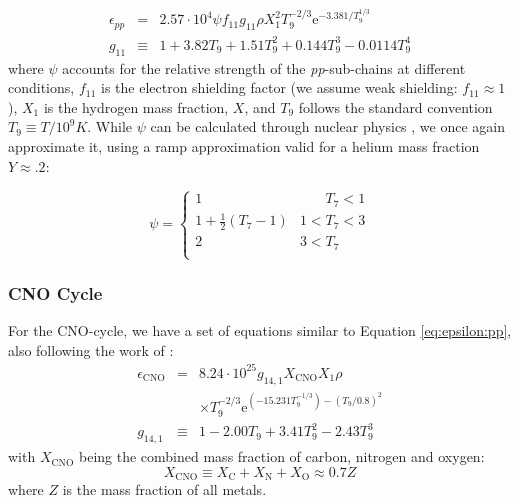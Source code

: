\begin{eqnarray}
  \epsilon_{pp} &=& 2.57 \cdot 10^4 \psi f_{11} g_{11} \rho X_1^2 T_9^{-2/3} \mathrm{e}^{-3.381/T_9^{1/3}} \label{eq:epsilon:pp} \\
  g_{11} &\equiv& 1 + 3.82 T_9 + 1.51 T_9^2 + 0.144 T_9^3 - 0.0114 T_9^4
\end{eqnarray}
where $\psi$ accounts for the relative strength of the \emph{pp}-sub-chains at different conditions, $f_{11}$ is the electron shielding factor (we assume weak shielding: $f_{11} \approx 1$), $X_1$ is the hydrogen mass fraction, $X$, and $T_9$ follows the standard convention $T_9 \equiv T / 10^9 K$. While $\psi$ can be calculated through nuclear physics \citep[cf.][]{Parker}, we once again approximate it, using a ramp approximation valid for a helium mass fraction $Y \approx .2$:

\begin{equation}
  \psi =
  \begin{cases}
   1 &  \phantom{3 < } T_7 < 1 \\
   1 + \frac{1}{2}\left(T_7 -1 \right)  & 1 < T_7 < 3\\
    2  & 3 < T_7 \\
  \end{cases}
  \label{eq:psi}
\end{equation}

\subsubsection{CNO Cycle}
For the CNO-cycle, we have a set of equations similar to Equation \ref{eq:epsilon:pp}, also following the work of \cite{Angulo}:
\begin{eqnarray}
  \epsilon_{\mathrm{CNO}} &=& 8.24 \cdot 10^25 g_{14,1} X_{\mathrm{CNO}} X_1 \rho \\
   && \times T_9^{-2/3} \mathrm{e}^{\left(-15.231 T_9^{-1/3}\right) - \left( T_9 / 0.8 \right)^2}  \nonumber \\
  g_{14,1} &\equiv& 1 - 2.00 T_9 + 3.41 T_9^2 - 2.43 T_9^3
  \label{eq:epsilon:CNO}
\end{eqnarray}
with $X_{\mathrm{CNO}}$ being the combined mass fraction of carbon, nitrogen and oxygen:
\begin{equation}
   X_{\mathrm{CNO}} \equiv X_{\mathrm{C}} + X_{\mathrm{N}} + X_{\mathrm{O}} \approx 0.7 Z
   \label{eq:X:CNO}
\end{equation}
where $Z$ is the mass fraction of all metals.


